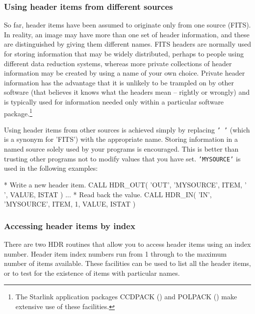 \documentclass[twoside,11pt,nolof]{starlink}
\providecommand{\myverb}[1]{{\texttt{#1}}}
\newenvironment{code}{\begin{small}}
                     {\end{small}}
\begin{document}
\subsubsection{Using \label{IMGNAMEDEXTENSIONS}header items from different sources}
So far, header items have been assumed to originate only from one
source (FITS). In reality, an image may have more than one
set of header information, and these are distinguished by giving them
different names. FITS headers are normally used for storing
information that may be widely distributed, perhaps to people using
different data reduction systems, whereas more private collections of
header information may be created by using a name of your own
choice. Private header information has the advantage that it is
unlikely to be trampled on by other software (that believes it knows
what the headers mean -- rightly or wrongly) and is typically used for
information needed only within a particular software
package.\footnote{The Starlink application packages CCDPACK
() and POLPACK () make
extensive use of these facilities.}

Using header items from other sources is achieved simply by replacing
\myverb{' '} (which is a synonym for 'FITS') with the appropriate
name.  Storing information in a named source solely used by your
programs is encouraged. This is better than trusting other programs
not to modify values that you have set. \myverb{'MYSOURCE'} is used in
the following examples:
\begin{code}
\begin{terminalv}
*  Write a new header item.
      CALL HDR_OUT( 'OUT', 'MYSOURCE', ITEM, ' ', VALUE, ISTAT )
      ...
*  Read back the value.
      CALL HDR_IN( 'IN', 'MYSOURCE', ITEM, 1, VALUE, ISTAT )
\end{terminalv}
\end{code}

\subsubsection{Accessing header items by index \label{HDRINDEXING}}
There are two HDR routines that allow you to access header items using
an index number. Header item index numbers run from 1 through to the
maximum number of items available. These facilities can be used to
list all the header items, or to test for the existence of items with
particular names.
\end{document}
